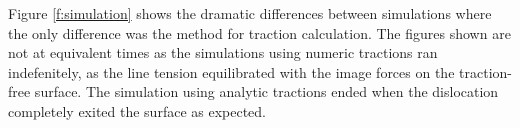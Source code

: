 \documentclass[11pt]{iopart}
\begin{document}
Figure \cref{f:simulation} shows the dramatic differences between simulations where the only difference was the method for traction calculation. The figures shown are not at equivalent times as the simulations using numeric tractions ran indefenitely, as the line tension equilibrated with the image forces on the traction-free surface. The simulation using analytic tractions ended when the dislocation completely exited the surface as expected.
\begin{figure}
    ~
    ~


\end{figure}
\end{document}
